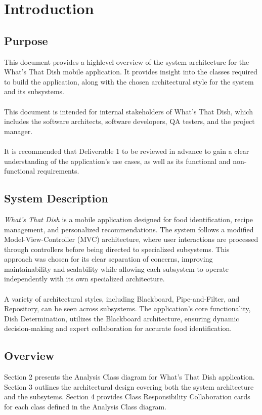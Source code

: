 \documentclass[]{article}
\begin{document}
\newpage
\section{Introduction}
\label{sec:introduction}

\subsection{Purpose}
\label{sub:purpose}
This document provides a highlevel overview of the system architecture for the What’s That Dish mobile application.
It provides insight into the classes required to build the application, along with the chosen architectural style for the system and its subsystems.
\\
\\
This document is intended for internal stakeholders of What’s That Dish, which includes the software architects, software developers, QA testers, and the project manager.
\\
\\
It is recommended that Deliverable 1 to be reviewed in advance to gain a clear understanding of the application’s use cases, as well as its functional and non-functional requirements.

\subsection{System Description}
\label{sub:system_description}
\textit{What’s That Dish} is a mobile application designed for food identification, recipe management, and personalized recommendations. The system follows a modified Model-View-Controller (MVC) architecture, where user interactions are processed through controllers before being directed to specialized subsystems. This approach was chosen for its clear separation of concerns, improving maintainability and scalability while allowing each subsystem to operate independently with its own specialized architecture.
\\
\\
A variety of architectural styles, including Blackboard, Pipe-and-Filter, and Repository, can be seen across subsystems. The application's core functionality, Dish Determination, utilizes the Blackboard architecture, ensuring dynamic decision-making and expert collaboration for accurate food identification.

\subsection{Overview}
\label{sub:overview}
Section 2 presents the Analysis Class diagram for What's That Dish application.
Section 3 outlines the architectural design covering both the system architecture and the subsytems.
Section 4 provides Class Responsibility Collaboration cards for each class defined in the Analysis Class diagram.
\end{document}
